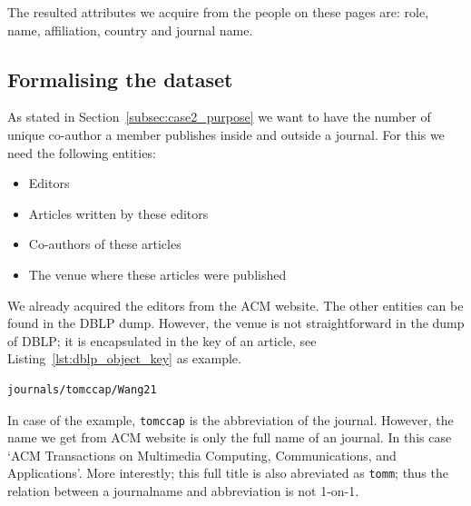 \documentclass{ou-report}
\newcommand{\dblp}{DBLP}
\begin{document}
The resulted attributes we acquire from the people on these pages are: role,
name, affiliation, country and journal name.

\subsection{Formalising the dataset}
As stated in Section~\ref{subsec:case2_purpose} we want to have the number of
unique co-author a member publishes inside and outside a journal. For this we
need the following entities:
\begin{itemize}
    \item Editors
    \item Articles written by these editors
    \item Co-authors of these articles
    \item The venue where these articles were published
\end{itemize}

We already acquired the editors from the ACM website. The other entities can be 
found in the \dblp{} dump. 
However, the venue is not straightforward in the dump of \dblp{}; it is 
encapsulated in the key of an article, see Listing~\ref{lst:dblp_object_key} 
as example.

\lstset{language=XML}
\begin{lstlisting}[caption={Example DBLP key},label={lst:dblp_object_key}]
journals/tomccap/Wang21
\end{lstlisting}

In case of the example, \verb|tomccap| is the abbreviation of the journal. However, 
the name we get from ACM website is only the full name of an journal. In this
case `ACM Transactions on Multimedia Computing, Communications, and
Applications'.
More interestly; this full title is also abreviated as \verb|tomm|; thus the relation
between a journalname and abbreviation is not 1-on-1.

\end{document}
